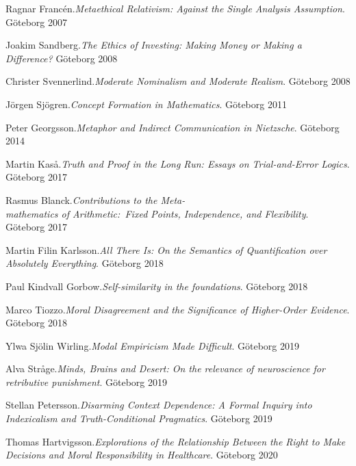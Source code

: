 \documentclass[fontsize=14pt,
               paper=297mm:210mm,
               twoside,
               pagesize=pdftex,
               DIV=calc
]{scrbook}
\begin{document}
\begin{multicols*}{2}
\begin{Volumes}
\pagebreak

\item Ragnar Franc\'{e}n.\enspace\textit{Metaethical Relativism: Against the Single Analysis Assumption}. \mbox{G\"oteborg} 2007

\item Joakim Sandberg.\enspace\textit{The Ethics of Investing: Making Money or Making a Difference?} \mbox{G\"oteborg} 2008

\item Christer Svennerlind.\enspace\textit{Moderate Nominalism and Moderate Realism}. \mbox{G\"oteborg} 2008

\item J\"orgen Sj\"ogren.\enspace\textit{Concept Formation in Mathematics}. \mbox{G\"oteborg} 2011

\item Peter Georgsson.\enspace\textit{Metaphor and Indirect Communication in Nietzsche}. \mbox{G\"oteborg} 2014

\item Martin Kas\aa{}.\enspace\textit{Truth and Proof in the Long Run: Essays on Trial-and-Error Logics}. \mbox{G\"oteborg} 2017

\item Rasmus Blanck.\enspace\textit{Contributions to the Meta-\\mathematics of Arithmetic:~Fixed Points, Independence, and Flexibility}. \mbox{G\"oteborg} 2017

\item Martin Filin Karlsson.\enspace\textit{All There Is: On the Semantics of Quantification over Absolutely Everything}. \mbox{G\"oteborg} 2018

\item Paul Kindvall Gorbow.\enspace\textit{Self-similarity in the foundations}. \mbox{G\"oteborg} 2018

\item Marco Tiozzo.\enspace\textit{Moral Disagreement and the Significance of Higher-Order Evidence}. \mbox{G\"oteborg} 2018

\item Ylwa Sj\"olin Wirling.\enspace\textit{Modal Empiricism Made Difficult}. \mbox{G\"oteborg} 2019

\item Alva Str\aa{}ge.\enspace\textit{Minds, Brains and Desert: On the relevance of neuroscience for retributive punishment}. \mbox{G\"oteborg} 2019

\item Stellan Petersson.\enspace\textit{Disarming Context Dependence: A Formal Inquiry into Indexicalism and Truth-Conditional Pragmatics}. \mbox{G\"oteborg} 2019

\item Thomas Hartvigsson.\enspace\textit{Explorations of the Relationship Between the Right to Make Decisions and Moral Responsibility in Healthcare}. \mbox{G\"oteborg} 2020
\end{Volumes}
\end{multicols*}
\end{document}
